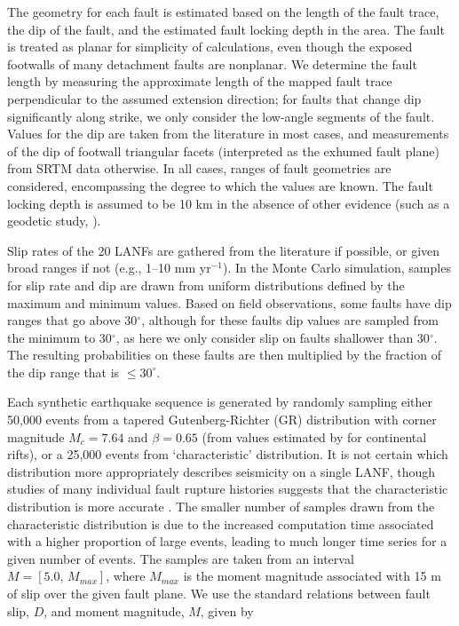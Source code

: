 \documentclass[draft,grl]{AGUTeX}
\begin{document}
\begin{article}
The geometry for each fault is estimated based on the length of the fault
trace, the dip of the fault, and the estimated fault locking depth in the area.
The fault is treated as planar for simplicity of calculations, even though the
exposed footwalls of many detachment faults are nonplanar.  We determine the
fault length by measuring the approximate length of the mapped fault trace
perpendicular to the assumed extension direction; for faults that change dip
significantly along strike, we only consider the low-angle segments of the
fault.  Values for the dip are taken from the literature in most cases, and
measurements of the dip of footwall triangular facets (interpreted as the
exhumed fault plane) from SRTM data otherwise. In all cases, ranges of fault
geometries are considered, encompassing the degree to which the values are
known. The fault locking depth is assumed to be 10 km in the absence of other
evidence (such as a geodetic study, \citep[e.g.,][]{hreinsdottir2009altotib}).

Slip rates of the 20 LANFs are gathered from the literature if possible, or
given broad ranges if not (e.g., 1--10 mm yr$^{-1}$).  In the Monte Carlo
simulation, samples for slip rate and dip are drawn from uniform distributions
defined by the maximum and minimum values.  Based on field observations, some
faults have dip ranges that go above 30$^\circ$, although for these faults dip
values are sampled from the minimum to 30$^\circ$, as here we only consider
slip on faults shallower than 30$^\circ$. The resulting probabilities on these
faults are then multiplied by the fraction of the dip range that is
$\le30^\circ$.

Each synthetic earthquake sequence is generated by randomly sampling either
50,000 events from a tapered Gutenberg-Richter (GR) distribution with corner
magnitude $M_c = 7.64$ and $\beta = 0.65$ (from values estimated by
\citet{birdkagan2004f_m} for continental rifts), or a 25,000 events from
`characteristic' distribution. It is not certain which distribution more
appropriately describes seismicity on a single LANF, though studies of many
individual fault rupture histories suggests that the characteristic
distribution is more accurate \citep[e.g.,][]{hecker2013eqdist}.  The smaller
number of samples drawn from the characteristic distribution is due to the
increased computation time associated with a higher proportion of large events,
leading to much longer time series for a given number of events.  The samples
are taken from an interval $M = [5.0, \, M_{max}]$, where $M_{max}$ is the
moment magnitude associated with 15 m of slip over the given fault plane.  We
use the standard relations between fault slip, $D$, and moment magnitude, $M$,
given by


\end{article}
\end{document}
